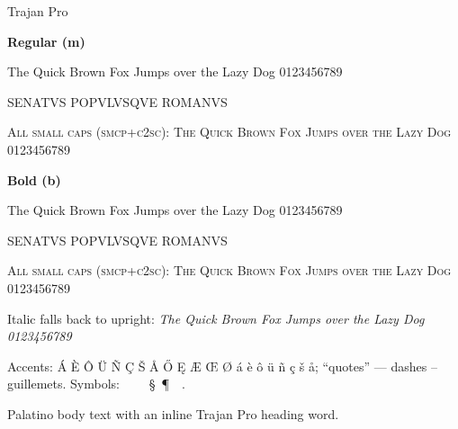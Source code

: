 \documentclass[11pt]{article}
\newcommand{\pangram}{The Quick Brown Fox Jumps over the Lazy Dog 0123456789}
\begin{document}
{\trajanfamily\Huge Trajan Pro\par}
\bigskip

{\trajanfamily
\textbf{Regular (m)}\par
\pangram\par
{\Large SENATVS POPVLVSQVE ROMANVS\par}
\textsc{All small caps (smcp+c2sc): \pangram}\par
\medskip
{\bfseries Bold (b)\par
\pangram\par
{\Large SENATVS POPVLVSQVE ROMANVS\par}
\textsc{All small caps (smcp+c2sc): \pangram}\par}
\medskip
Italic falls back to upright: \textit{\pangram}\par
Accents: \'A \`E \^O \"U \~N \c{C} \v{S} \r{A} \H{O} \k{E} {\AE} {\OE} {\O}
\'a \`e \^o \"u \~n \c{c} \v{s} \r{a}; ``quotes'' --- dashes --
\guillemotleft guillemets\guillemotright.
Symbols: \textbullet\ \textdegree\ \textcopyright\ \textregistered\ \S\ \P\
\textperthousand\ \textdagger.\par
}

\bigskip
Palatino body text with an inline {\trajanfamily Trajan Pro} heading word.
\end{document}
